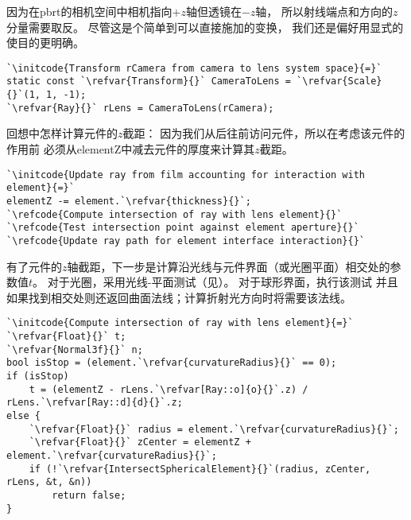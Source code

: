 因为在pbrt的相机空间中相机指向$+z$轴但透镜在$-z$轴，
所以射线端点和方向的$z$分量需要取反。
尽管这是个简单到可以直接施加的变换，
我们还是偏好用显式的使目的更明确。
\begin{lstlisting}
`\initcode{Transform rCamera from camera to lens system space}{=}`
static const `\refvar{Transform}{}` CameraToLens = `\refvar{Scale}{}`(1, 1, -1);
`\refvar{Ray}{}` rLens = CameraToLens(rCamera);
\end{lstlisting}

回想中怎样计算元件的$z$截距：
因为我们从后往前访问元件，所以在考虑该元件的作用前
必须从{\ttfamily elementZ}中减去元件的厚度来计算其$z$截距。
\begin{lstlisting}
`\initcode{Update ray from film accounting for interaction with element}{=}`
elementZ -= element.`\refvar{thickness}{}`;
`\refcode{Compute intersection of ray with lens element}{}`
`\refcode{Test intersection point against element aperture}{}`
`\refcode{Update ray path for element interface interaction}{}`
\end{lstlisting}

有了元件的$z$轴截距，下一步是计算沿光线与元件界面（或光圈平面）相交处的参数值$t$。
对于光圈，采用光线-平面测试（见）。
对于球形界面，执行该测试
并且如果找到相交处则还返回曲面法线；计算折射光方向时将需要该法线。
\begin{lstlisting}
`\initcode{Compute intersection of ray with lens element}{=}`
`\refvar{Float}{}` t;
`\refvar{Normal3f}{}` n;
bool isStop = (element.`\refvar{curvatureRadius}{}` == 0);
if (isStop)
    t = (elementZ - rLens.`\refvar[Ray::o]{o}{}`.z) / rLens.`\refvar[Ray::d]{d}{}`.z;
else {
    `\refvar{Float}{}` radius = element.`\refvar{curvatureRadius}{}`;
    `\refvar{Float}{}` zCenter = elementZ + element.`\refvar{curvatureRadius}{}`;
    if (!`\refvar{IntersectSphericalElement}{}`(radius, zCenter, rLens, &t, &n))
        return false;
}
\end{lstlisting}

